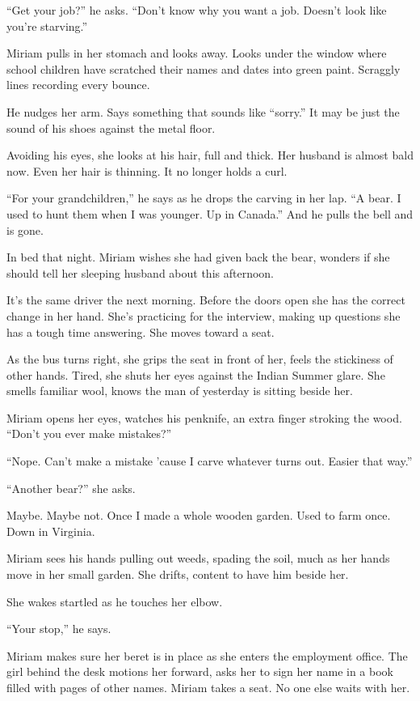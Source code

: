 \documentclass[twoside,10pt]{book}
\begin{document}
``Get your job?'' he asks. ``Don't know why you want a job. Doesn't look
like you're starving.''

Miriam pulls in her stomach and looks away. Looks under the window where
school children have scratched their names and dates into green paint.
Scraggly lines recording every bounce.

He nudges her arm. Says something that sounds like ``sorry.'' It may be
just the sound of his shoes against the metal floor.

Avoiding his eyes, she looks at his hair, full and thick. Her husband is
almost bald now. Even her hair is thinning. It no longer holds a curl.

``For your grandchildren,'' he says as he drops the carving in her lap.
``A bear. I used to hunt them when I was younger. Up in Canada.'' And he
pulls the bell and is gone.

In bed that night. Miriam wishes she had given back the bear, wonders if
she should tell her sleeping husband about this afternoon.

It's the same driver the next morning. Before the doors open she has the
correct change in her hand. She's practicing for the interview, making
up questions she has a tough time answering. She moves toward a seat.

As the bus turns right, she grips the seat in front of her, feels the
stickiness of other hands. Tired, she shuts her eyes against the Indian
Summer glare. She smells familiar wool, knows the man of yesterday is
sitting beside her.

Miriam opens her eyes, watches his penknife, an extra finger stroking
the wood. ``Don't you ever make mistakes?''

``Nope. Can't make a mistake 'cause I carve whatever turns out. Easier
that way.''

``Another bear?'' she asks.

Maybe. Maybe not. Once I made a whole wooden garden. Used to farm once.
Down in Virginia.

Miriam sees his hands pulling out weeds, spading the soil, much as her
hands move in her small garden. She drifts, content to have him beside
her.

She wakes startled as he touches her elbow.

``Your stop,'' he says.

Miriam makes sure her beret is in place as she enters the employment
office. The girl behind the desk motions her forward, asks her to sign
her name in a book filled with pages of other names. Miriam takes a
seat. No one else waits with her.
\end{document}
